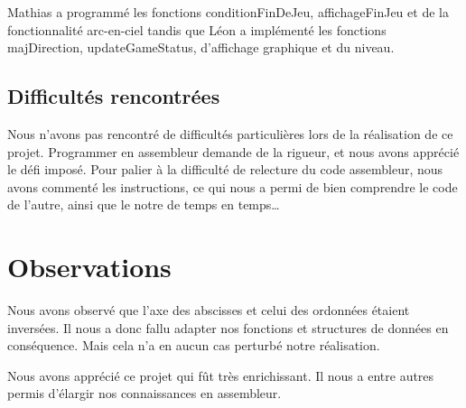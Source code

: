 \documentclass[a4paper]{article}
\begin{document}
Mathias a programmé les fonctions conditionFinDeJeu, affichageFinJeu et de la fonctionnalité arc-en-ciel tandis que Léon a implémenté les fonctions majDirection, 
updateGameStatus, d’affichage graphique et du niveau.

\subsection{Difficultés rencontrées}
Nous n'avons pas rencontré de difficultés particulières lors de la réalisation de ce projet. Programmer en assembleur demande de la rigueur, 
et nous avons apprécié le défi imposé.
Pour palier à la difficulté de relecture du code assembleur, nous avons commenté les instructions, ce qui nous a permi de bien comprendre le code de l'autre, 
ainsi que le notre de temps en temps\dots

\section{Observations}
Nous avons observé que l'axe des abscisses et celui des ordonnées étaient inversées. Il nous a donc fallu adapter nos fonctions et structures de données en conséquence.
Mais cela n'a en aucun cas perturbé notre réalisation.

Nous avons apprécié ce projet qui fût très enrichissant. Il nous a entre autres permis d'élargir nos connaissances en assembleur.
\end{document}
